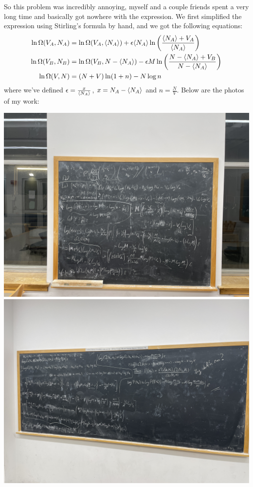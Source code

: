\documentclass[10pt]{article}
\begin{document}
\begin{enumerate}[label=\alph*), resume]
			\begin{solution}
				So this problem was incredibly annoying, myself and a couple friends spent a very long time 
				and basically got nowhere with the expression. We first simplified the expression 
				using Stirling's formula by hand, and we got the following equations:
				\begin{align*}
					\ln\Omega(V_A, N_A) &= \ln \Omega(V_A, \langle N_A \rangle) + \epsilon \langle N_A \rangle \ln \left( \frac{\langle N_A \rangle + V_A}{\langle N_A \rangle} \right) \\
					\ln \Omega(V_B, N_B) &= \ln \Omega(V_B, N - \langle N_A \rangle) - \epsilon M \ln
					\left( \frac{N - \langle N_A \rangle + V_B}{N-\langle N_A \rangle} \right) \\
					\ln \Omega(V, N) &= (N + V)\ln(1 + n) - N \log n
				\end{align*}
				where we've defined $\epsilon = \frac{x}{\langle N_A \rangle}$, $x = N_A - \langle N_A \rangle$ and 
				$n = \frac{N}{V}$. Below are the photos of my work:
				\begin{center}
					\includegraphics[scale=0.4]{bb1.jpg}
					\smallskip
					\includegraphics[scale=0.4]{bb2.jpg}

\end{center}
\end{solution}
\end{enumerate}
\end{document}
